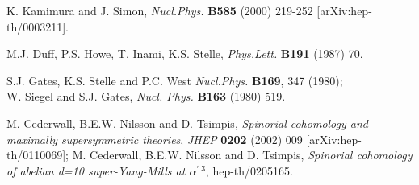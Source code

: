 \documentclass[a4paper,11pt]{article}
\begin{document}
\begin{thebibliography}{99}
K. Kamimura and J. Simon, 
{\em Nucl.Phys.} {\bf B585} (2000) 219-252
[arXiv:hep-th/0003211].


M.J. Duff, P.S. Howe, T. Inami, K.S. Stelle,
{\em Phys.Lett.} {\bf B191} (1987) 70.


S.J. Gates, K.S. Stelle and P.C. West
{\em Nucl.Phys.} {\bf B169}, 347 (1980); 
\\ W. Siegel and S.J. Gates,
{\em Nucl. Phys.} 
{\bf B163} (1980) 519. 


 M. Cederwall, B.E.W. Nilsson and D. Tsimpis, 
{\sl Spinorial cohomology and maximally supersymmetric theories}, 
{\em JHEP} {\bf  0202} (2002) 009 [arXiv:hep-th/0110069]; 
M. Cederwall, B.E.W. Nilsson and D. Tsimpis, 
{\sl Spinorial cohomology of abelian d=10 super-Yang-Mills at 
$\alpha^{\prime \; 3}$}, hep-th/0205165. 


\end{thebibliography}
\end{document}
